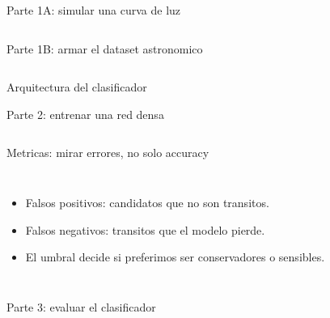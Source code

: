 \begin{frame}[fragile]{Parte 1A: simular una curva de luz}
\inputminted[firstline=1,lastline=21]{python}{codes/clase2-p1.py}
\end{frame}

\begin{frame}[fragile]{Parte 1B: armar el dataset astronomico}
\inputminted[firstline=22,lastline=42]{python}{codes/clase2-p1.py}
\end{frame}

\begin{frame}{Arquitectura del clasificador}
\centering
\resizebox{0.78\linewidth}{!}{}
\end{frame}

\begin{frame}[fragile]{Parte 2: entrenar una red densa}
\inputminted{python}{codes/clase2-p2.py}
\end{frame}

\begin{frame}{Metricas: mirar errores, no solo accuracy}
\begin{columns}[T,onlytextwidth]
\centering
{}
\begin{itemize}
    \item Falsos positivos: candidatos que no son transitos.
    \item Falsos negativos: transitos que el modelo pierde.
    \item El umbral decide si preferimos ser conservadores o sensibles.
\end{itemize}
\end{columns}
\end{frame}

\begin{frame}[fragile]{Parte 3: evaluar el clasificador}
\inputminted{python}{codes/clase2-p3.py}
\end{frame}

